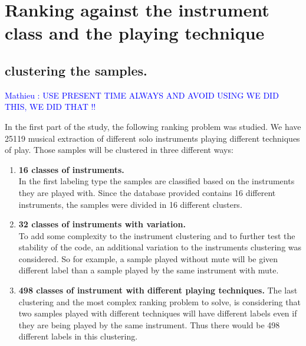 \documentclass[hidelinks,12pt]{report}
\newcommand{\ml}[1]{\textcolor{blue}{ Mathieu : #1}}
\begin{document}
\chapter{Ranking against the instrument class and the playing technique}
\section{clustering the samples.}

\ml{USE PRESENT TIME ALWAYS AND AVOID USING WE DID THIS, WE DID THAT !!}

In the first part of the study, the following ranking problem was studied. We have 25119 musical extraction of different solo instruments playing different techniques of play. Those samples will be clustered in three different ways: 
\begin{enumerate}
\item \textbf{ 16 classes of instruments.}\\
In the first labeling type the samples are classified based on the instruments they are played with. Since the database provided contains 16 different instruments, the samples were divided in 16 different clusters.
\item \textbf{32 classes of instruments with variation.}\\
To add some complexity to the instrument clustering and to further test the stability of the code, an additional variation to the instruments clustering was considered. So for example, a sample played without mute will be given different label than a sample played by the same instrument with mute.
\item \textbf{498 classes of instrument with different playing techniques.}
The last clustering and the most complex ranking problem to solve, is considering that two samples played with different techniques will have different labels even if they are being played by the same instrument. Thus there would be 498 different labels in this clustering.\\

\end{enumerate}
\end{document}
